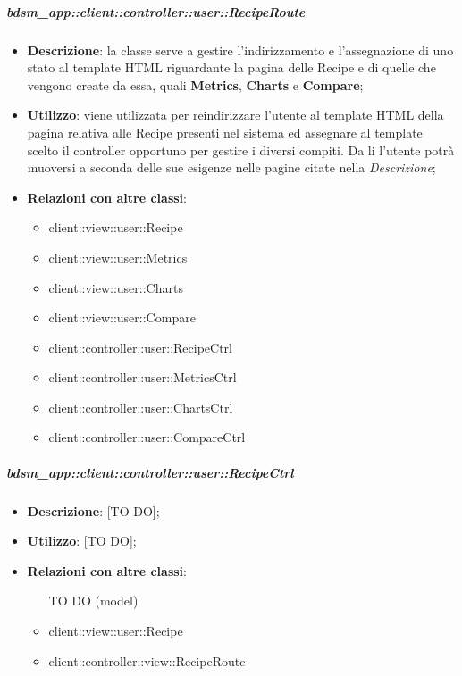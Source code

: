 		\subparagraph{bdsm\_app::client::controller::user::RecipeRoute} %
		\label{subp:bdsm_app_client_controller_user_reciperouteconfig}
			\begin{itemize}
				\item \textbf{Descrizione}: la classe serve a gestire l'indirizzamento e l'assegnazione di uno stato al template HTML riguardante la pagina delle Recipe e di quelle che vengono create da essa, quali \textbf{Metrics}, \textbf{Charts} e \textbf{Compare};
				\item \textbf{Utilizzo}:  viene utilizzata per reindirizzare l'utente al template HTML della pagina relativa alle Recipe presenti nel sistema ed assegnare al template scelto il controller opportuno per gestire i diversi compiti.  Da li l'utente potrà muoversi a seconda delle sue esigenze nelle pagine citate nella \emph{Descrizione};
				\item \textbf{Relazioni con altre classi}:
					\begin{itemize}
						\item client::view::user::Recipe
						\item client::view::user::Metrics
						\item client::view::user::Charts
						\item client::view::user::Compare
						\item client::controller::user::RecipeCtrl
						\item client::controller::user::MetricsCtrl
						\item client::controller::user::ChartsCtrl
						\item client::controller::user::CompareCtrl
					\end{itemize}
			\end{itemize}

		\subparagraph{bdsm\_app::client::controller::user::RecipeCtrl} %
		\label{subp:client_controller_user_recipectrl}
			\begin{itemize}
				\item \textbf{Descrizione}: [TO DO];
				\item \textbf{Utilizzo}: [TO DO];
				\item \textbf{Relazioni con altre classi}:
					\begin{itemize}
						\item [TO DO] (model)
						\item client::view::user::Recipe
						\item client::controller::view::RecipeRoute
					\end{itemize}
			\end{itemize}

